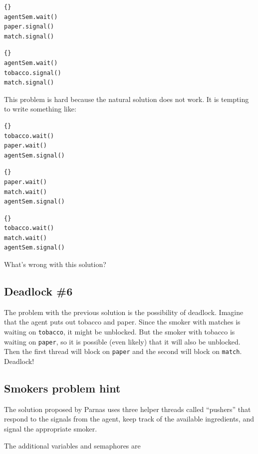 \documentclass{book}
\newcommand{\clearemptydoublepage}{\newpage\cleardoublepage}
\begin{document}
\begin{lstlisting}[caption={Agent B code}]{}
agentSem.wait()
paper.signal()
match.signal()
\end{lstlisting}

\begin{lstlisting}[caption={Agent C code}]{}
agentSem.wait()
tobacco.signal()
match.signal()
\end{lstlisting}

This problem is hard because the natural solution does not
work.  It is tempting to write something like:

\begin{lstlisting}[caption={Smoker with matches}]{}
tobacco.wait()
paper.wait()
agentSem.signal()
\end{lstlisting}

\begin{lstlisting}[caption={Smoker with tobacco}]{}
paper.wait()
match.wait()
agentSem.signal()
\end{lstlisting}

\begin{lstlisting}[caption={Smoker with paper}]{}
tobacco.wait()
match.wait()
agentSem.signal()
\end{lstlisting}

What's wrong with this solution?

\clearemptydoublepage
\subsection{Deadlock \#6}

The problem with the previous solution is the possibility
of deadlock.  Imagine that the agent puts out tobacco and
paper.  Since the smoker with matches is waiting on {\tt tobacco},
it might be unblocked.  But the smoker with tobacco is
waiting on {\tt paper}, so it is possible (even likely) that
it will also be unblocked.  Then the first thread will block
on {\tt paper} and the second will block on {\tt match}.
Deadlock!

\clearemptydoublepage
\subsection{Smokers problem hint}

The solution proposed by Parnas uses three helper threads
called ``pushers'' that respond to the signals from the agent,
keep track of the available ingredients, and signal the
appropriate smoker.

The additional variables and semaphores are
\end{document}
